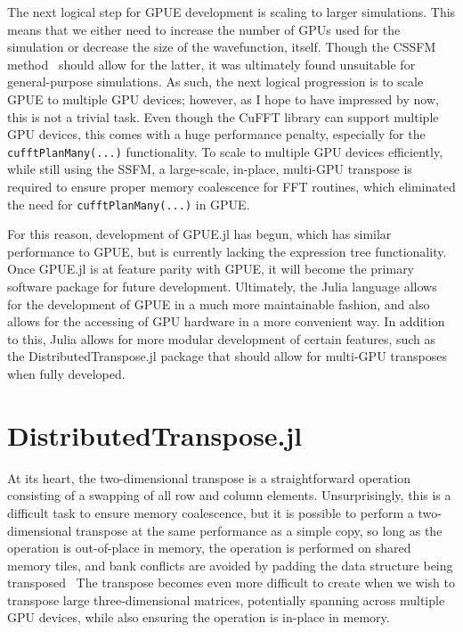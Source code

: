 The next logical step for GPUE development is scaling to larger simulations.
This means that we either need to increase the number of GPUs used for the simulation or decrease the size of the wavefunction, itself.
Though the CSSFM method~\cite{bayindir2015} should allow for the latter, it was ultimately found unsuitable for general-purpose simulations.
As such, the next logical progression is to scale GPUE to multiple GPU devices; however, as I hope to have impressed by now, this is not a trivial task.
Even though the CuFFT library can support multiple GPU devices, this comes with a huge performance penalty, especially for the \texttt{cufftPlanMany(...)} functionality.
To scale to multiple GPU devices efficiently, while still using the SSFM, a large-scale, in-place, multi-GPU transpose is required to ensure proper memory coalescence for FFT routines, which eliminated the need for \texttt{cufftPlanMany(...)} in GPUE.

For this reason, development of GPUE.jl has begun, which has similar performance to GPUE, but is currently lacking the expression tree functionality.
Once GPUE.jl is at feature parity with GPUE, it will become the primary software package for future development.
Ultimately, the Julia language allows for the development of GPUE in a much more maintainable fashion, and also allows for the accessing of GPU hardware in a more convenient way.
In addition to this, Julia allows for more modular development of certain features, such as the DistributedTranspose.jl package that should allow for multi-GPU transposes when fully developed.

\section{DistributedTranspose.jl}
\label{sec:DT}

At its heart, the two-dimensional transpose is a straightforward operation consisting of a swapping of all row and column elements.
Unsurprisingly, this is a difficult task to ensure memory coalescence, but
it is possible to perform a two-dimensional transpose at the same performance as a simple copy, so long as the operation is out-of-place in memory, the operation is performed on shared memory tiles, and bank conflicts are avoided by padding the data structure being transposed~\cite{harris2013}
The transpose becomes even more difficult to create when we wish to transpose large three-dimensional matrices, potentially spanning across multiple GPU devices, while also ensuring the operation is in-place in memory.

